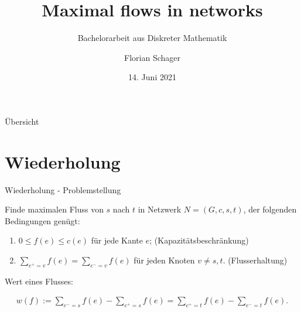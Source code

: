 \documentclass[aspectratio=169]{beamer}
\title[Maximum Flow Problem]{Maximal flows in networks}
\subtitle{Bachelorarbeit aus Diskreter Mathematik}
\author[F. Schager]{Florian Schager}
\institute[TU Wien]{TU Wien, Vienna, Austria}
\date{14. Juni 2021}
\begin{document}
\begin{frame}
    \titlepage
\end{frame}

\begin{frame}{Übersicht}
  \tableofcontents
\end{frame}


\section{Wiederholung}

\begin{frame}{Wiederholung - Problemstellung}

  \begin{problem*}
    Finde maximalen Fluss von $s$ nach $t$ in Netzwerk $N = (G,c,s,t)$, 
    der folgenden Bedingungen genügt:

    \begin{enumerate}
      \item $0 \leq f(e) \leq c(e)$ für jede Kante $e$; \quad (Kapazitätsbeschränkung)
      \item $\sum_{e^+ = v} f(e) = \sum_{e^- = v} f(e)$ für jeden Knoten $v \neq s,t$.
      \quad (Flusserhaltung)
    \end{enumerate}

    \vspace{0.2cm}

    Wert eines Flusses:

    \begin{align*}
      w(f) := \sum_{e^- = s}f(e) - \sum_{e^+ = s} f(e) = \sum_{e^+ = t}f(e) - \sum_{e^- = t} f(e).
    \end{align*}
    
  \end{problem*}
  

\end{frame}
\end{document}
